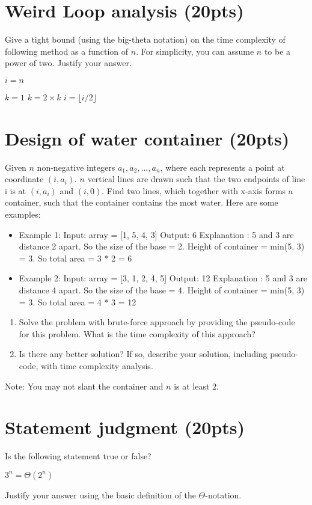 \documentclass{article}[12pt]
\begin{document}
\section{Weird Loop analysis (20pts)}

Give a tight bound (using the big-theta notation) on the time complexity of following method as a function of $n$. For simplicity, you can assume $n$ to be a power of two. Justify your answer.

\hfill \break

\begin{algorithmic}
\State $i = n$

        \State $k = 1$
            \State $k = 2 \times k$
        \EndWhile
    \EndFor
    \State $i = \lfloor i / 2 \rfloor$
\EndWhile
\EndFunction
\end{algorithmic}



\section{Design of water container (20pts)}
Given $n$ non-negative integers $a_1, a_2, ..., a_n$, where each represents a point at coordinate $(i, a_i)$. $n$ vertical lines are drawn such that the two endpoints of line i is at $(i, a_i)$ and $(i, 0)$. Find two lines, which together with x-axis forms a container, such that the container contains the most water. Here are some examples:

\begin{itemize}
\item Example 1:
\subitem Input: array = [1, 5, 4, 3]
\subitem Output: 6
\subitem Explanation : 5 and 3 are distance 2 apart. So the size of the base = 2. Height of container = min(5, 3) = 3. So total area = 3 * 2 = 6
\item Example 2:
\subitem Input: array = [3, 1, 2, 4, 5]
\subitem Output: 12
\subitem Explanation : 5 and 3 are distance 4 apart. So the size of the base = 4. Height of container = min(5, 3) = 3. So total area = 4 * 3 = 12
\end{itemize}

\begin{enumerate}
\item {Solve the problem with brute-force approach by providing the pseudo-code for this problem. What is the time complexity of this approach?}
\item {Is there any better solution? If so, describe your solution, including pseudo-code, with time complexity analysis.}
\end{enumerate}
{Note: You may not slant the container and $n$ is at least $2$.}



\section{Statement judgment (20pts)}
Is the following statement true or false?
\begin{center}
{$3^n = \Theta(2^n)$}
\end{center}
{Justify your answer using the basic definition of the $\Theta$-notation.}
\end{document}
